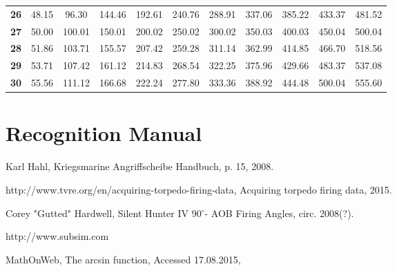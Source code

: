 \documentclass{article}
\newcommand{\degree}{$^{\circ}$}
\begin{document}
\begin{table}[h]
\begin{tabular}{c|cccccccccc}
\textbf{26}      & 48.15      & 96.30      & 144.46     & 192.61     & 240.76     & 288.91     & 337.06     & 385.22     & 433.37     & 481.52      \\
\textbf{27}      & 50.00      & 100.01     & 150.01     & 200.02     & 250.02     & 300.02     & 350.03     & 400.03     & 450.04     & 500.04      \\
\textbf{28}      & 51.86      & 103.71     & 155.57     & 207.42     & 259.28     & 311.14     & 362.99     & 414.85     & 466.70     & 518.56      \\
\textbf{29}      & 53.71      & 107.42     & 161.12     & 214.83     & 268.54     & 322.25     & 375.96     & 429.66     & 483.37     & 537.08      \\
\textbf{30}      & 55.56      & 111.12     & 166.68     & 222.24     & 277.80     & 333.36     & 388.92     & 444.48     & 500.04     & 555.60     
\end{tabular}
\end{table}

\section{Recognition Manual}


\pagebreak
\begin{thebibliography}{9}

  Karl Hahl,
  Kriegsmarine Angriffscheibe Handbuch,
  p. 15,
  2008.
  
http://www.tvre.org/en/acquiring-torpedo-firing-data,
Acquiring torpedo firing data,
2015.

Corey "Gutted" Hardwell,
Silent Hunter IV 90\degree - AOB Firing Angles,
circ. 2008(?).

http://www.subsim.com

MathOnWeb,
The arcsin function,
Accessed 17.08.2015,


\end{thebibliography}
\end{document}
